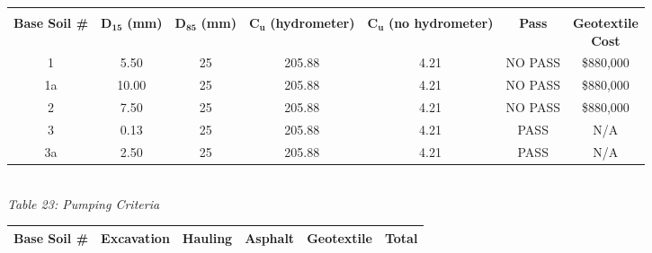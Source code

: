\documentclass{article}
\begin{document}
\begin{center}
    \vspace{7mm}
    \begin{tabular}{|c|cccccc|}
        \hline
        &&&&&&\\
        \textbf{Base Soil \#} & \shortstack[c]{\textbf{$\bm{D_{15}}$}\\\textbf{(mm)}} & \shortstack[c]{\textbf{$\bm{D_{85}}$}\\\textbf{(mm)}} & \shortstack[c]{\textbf{$\bm{C_{u}}$}\\\textbf{(hydrometer)}} & \shortstack[c]{\textbf{$\bm{C_{u}}$}\\\textbf{(no hydrometer)}}  &\textbf{Pass} & \shortstack[c]{\textbf{Geotextile}\\\textbf{Cost}}  \\\hline
        1             & 5.50                                & 25                                 & 205.88                                            & 4.21                                                 & NO PASS & \$880,000  \\
        1a            & 10.00                               & 25                                 & 205.88                                            & 4.21                                                 & NO PASS & \$880,000  \\
        2             & 7.50                                & 25                                 & 205.88                                            & 4.21                                                 & NO PASS & \$880,000 \\
        3             & 0.13                                & 25                                 & 205.88                                            & 4.21                                                 & PASS & N/A  \\
        3a            & 2.50                                & 25                                 & 205.88                                            & 4.21                                                 & PASS & N/A  \\\hline
    \end{tabular}
    \vspace{3mm}
    \emph{\\Table 23: Pumping Criteria\\}
    \vspace{7mm}
    \begin{tabular}{|c|ccccc|}
        \hline
        \textbf{Base Soil \#} & \textbf{Excavation} & \textbf{Hauling} & \textbf{Asphalt} & \textbf{Geotextile} & \textbf{Total} \\\hline

\end{tabular}
\end{center}
\end{document}
